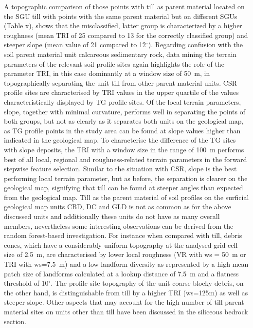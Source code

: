 \documentclass[preprint,12pt,authoryear]{elsarticle}
\begin{document}
 A topographic comparison of those points with till as parent material located on the SGU till with points with the same parent material but on different SGUs (Table x), shows that the misclassified, latter group is characterized by a higher roughness (mean TRI of 25 compared to 13 for the correctly classified group) and steeper slope (mean value of 21 compared to 12$^{\circ}$). Regarding confusion with the soil parent material unit calcareous sedimentary rock, data mining the terrain parameters of the relevant soil profile sites again highlights the role of the parameter TRI, in this case dominantly at a window size of 50~m, in topographically separating the unit till from other parent material units. CSR profile sites are characterised by TRI values in the upper quartile of the values characteristically displayed by TG profile sites. Of the local terrain parameters, slope, together with minimal curvature, performs well in separating the points of both groups, but not as clearly as it separates both units on the geological map, as TG profile points in the study area can be found at slope values higher than indicated in the geological map. To characterise the difference of the TG sites with slope deposits, the TRI with a window size in the range of 100~m performs best of all local, regional and roughness-related terrain parameters in the forward stepwise feature selection. Similar to the situation with CSR, slope is the best performing local terrain parameter, but as before, the separation is clearer on the geological map, signifying that till can be found at steeper angles than   expected from the geological map. Till as the parent material of soil profiles on the surficial geological map units CBD, DC and GLD is not as common as for the above discussed units and additionally these units do not have as many overall members, nevertheless some interesting observations can be derived from the random forest-based investigation. For instance when compared with till, debris cones, which have a considerably uniform topography at the analysed grid cell size of 2.5~m, are characterised by lower local roughness (VR with ws = 50~m or TRI with ws=7.5~m) and a low landform diversity as represented by a high mean patch size of landforms calculated at a lookup distance of 7.5~m and a flatness threshold of 10$^{\circ}$. The profile site topography of the unit coarse blocky debris, on the other hand, is distinguishable from till by a higher TRI (ws=125m) as well as steeper slope. Other aspects that may account for the high number of till parent material sites on units other than till have been discussed in the siliceous bedrock section.
 
\end{document}
